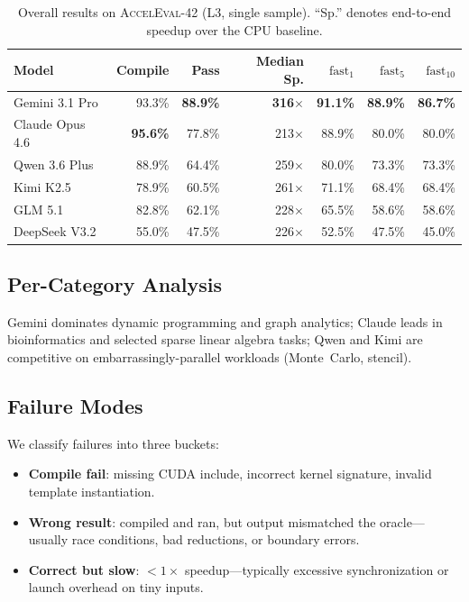 \documentclass{article}
\begin{document}
\begin{table}[ht]
\centering
\small
\caption{Overall results on \textsc{AccelEval}-42 (L3, single sample). ``Sp.'' denotes end-to-end speedup over the CPU baseline.}
\label{tab:overall}
\begin{tabular}{@{}lrrrrrr@{}}
\toprule
\textbf{Model} & \textbf{Compile} & \textbf{Pass} & \textbf{Median Sp.} & \textbf{$\mathrm{fast}_1$} & \textbf{$\mathrm{fast}_5$} & \textbf{$\mathrm{fast}_{10}$} \\
\midrule
Gemini 3.1 Pro     & 93.3\% & \textbf{88.9\%} & \textbf{316$\times$} & \textbf{91.1\%} & \textbf{88.9\%} & \textbf{86.7\%} \\
Claude Opus 4.6    & \textbf{95.6\%} & 77.8\% & 213$\times$ & 88.9\% & 80.0\% & 80.0\% \\
Qwen 3.6 Plus      & 88.9\% & 64.4\% & 259$\times$ & 80.0\% & 73.3\% & 73.3\% \\
Kimi K2.5          & 78.9\% & 60.5\% & 261$\times$ & 71.1\% & 68.4\% & 68.4\% \\
GLM 5.1            & 82.8\% & 62.1\% & 228$\times$ & 65.5\% & 58.6\% & 58.6\% \\
DeepSeek V3.2      & 55.0\% & 47.5\% & 226$\times$ & 52.5\% & 47.5\% & 45.0\% \\
\bottomrule
\end{tabular}
\end{table}

\subsection{Per-Category Analysis}
Gemini dominates dynamic programming and graph analytics; Claude leads in bioinformatics and selected sparse linear algebra tasks; Qwen and Kimi are competitive on embarrassingly-parallel workloads (Monte~Carlo, stencil).

\subsection{Failure Modes}
We classify failures into three buckets:
\begin{itemize}
  \item \textbf{Compile fail}: missing CUDA include, incorrect kernel signature, invalid template instantiation.
  \item \textbf{Wrong result}: compiled and ran, but output mismatched the oracle---usually race conditions, bad reductions, or boundary errors.
  \item \textbf{Correct but slow}: $<1\times$ speedup---typically excessive synchronization or launch overhead on tiny inputs.
\end{itemize}
\end{document}
